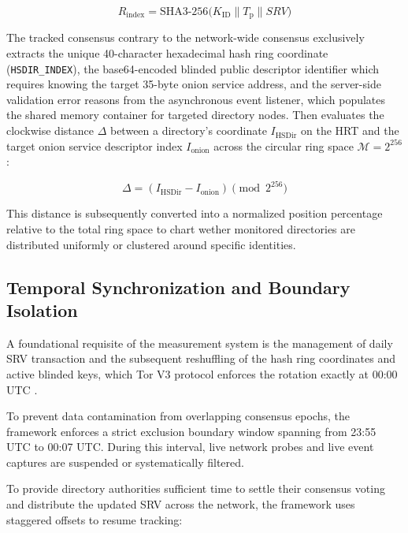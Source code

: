 \documentclass[conference]{IEEEtran}
\begin{document}
\begin{equation}
\textit{R}_{\text{index}} = \text{SHA3-256}\big(\textit{K}_{\text{ID}} \parallel \textit{T}_{\text{p}} \parallel \textit{SRV} \big)
\end{equation}

The tracked consensus contrary to the network-wide consensus exclusively extracts the unique 40-character hexadecimal hash ring coordinate (\texttt{HSDIR\_INDEX}), the base64-encoded blinded public descriptor identifier which requires knowing the target 35-byte onion service address, and the server-side validation 
error reasons from the asynchronous event listener, which populates the shared memory container for targeted directory nodes. Then evaluates the clockwise distance $\Delta$ between a directory's coordinate $\textit{I}_{\text{HSDir}}$ on the HRT and the target onion service descriptor index $\textit{I}_{\text{onion}}$ 
across the circular ring space $\mathcal{M} = 2^{256}$:

\begin{equation}
\Delta = \left( I_{\text{HSDir}} - I_{\text{onion}} \right) \pmod{2^{256}}
\end{equation}

This distance is subsequently converted into a normalized position percentage relative to the total ring space to chart wether monitored directories are distributed uniformly or clustered around specific identities.

\subsection{Temporal Synchronization and Boundary Isolation}

A foundational requisite of the measurement system is the management of daily SRV transaction and the subsequent reshuffling of the hash ring coordinates and active blinded keys, which Tor V3 protocol enforces the rotation exactly at 00:00 UTC \cite{tor_srvspec, tor_rendspec}.

To prevent data contamination from overlapping consensus epochs, the framework
enforces a strict exclusion boundary window spanning from 23:55 UTC to 00:07 UTC. During this interval, live network probes and live event captures are suspended or systematically filtered.

To provide directory authorities sufficient time to settle their consensus voting and distribute the updated SRV across the network, the framework uses staggered offsets to resume tracking:
\end{document}
